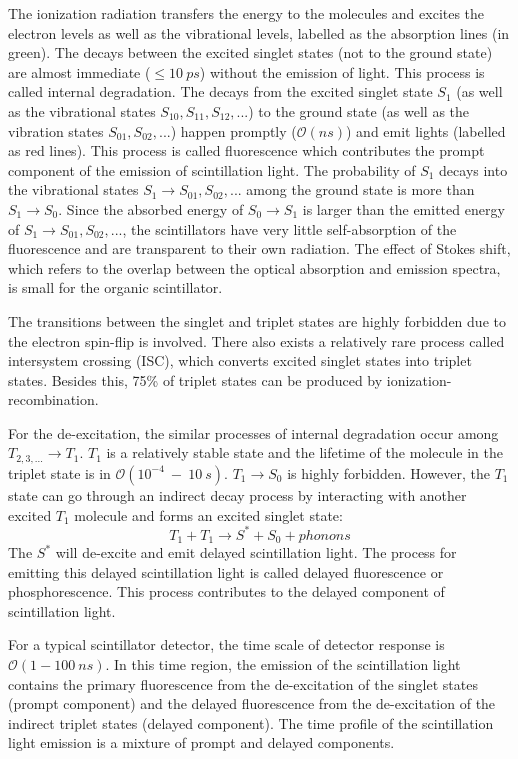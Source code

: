 The ionization radiation transfers the energy to the molecules and excites the electron levels as well as the vibrational levels, labelled as the absorption lines (in green). The decays between the excited singlet states (not to the ground state) are almost immediate ($\leq 10~ps$) without the emission of light. This process is called internal degradation. The decays from the excited singlet state $S_1$ (as well as the vibrational states $S_{10},S_{11},S_{12},...$) to the ground state (as well as the vibration states $S_{01}, S_{02}, ...$) happen promptly ($\mathcal{O}(ns)$) and emit lights (labelled as red lines). This process is called fluorescence which contributes the prompt component of the emission of scintillation light. The probability of $S_1$ decays into the vibrational states $S_1 \to S_{01},S_{02},...$ among the ground state is more than $S_1\to S_0$. Since the absorbed energy of $S_0 \to S_1$ is larger than the emitted energy of $S_1 \to S_{01},S_{02},...$, the scintillators have very little self-absorption of the fluorescence and are transparent to their own radiation. The effect of Stokes shift, which refers to the overlap between the optical absorption and emission spectra, is small for the organic scintillator\cite{leo2012techniques,knoll2010radiation}. 

The transitions between the singlet and triplet states are highly forbidden due to the
electron spin-flip is involved\cite{von2015measurement,sorensen2016temperature}. There also exists a relatively rare process called intersystem crossing (ISC), which converts excited singlet states into triplet states. Besides this, 75\% of triplet states can be produced by ionization-recombination\cite{von2015measurement,dunger2018topological}.

For the de-excitation, the similar processes of internal degradation occur among $T_{2,3, ...} \to T_1$. $T_1$ is a relatively stable state and the lifetime of the molecule in the triplet state is in $\mathcal{O}(10^{-4}~-~10~s)$\cite{mcquarrie1997physical}. $T_1\to S_0$ is highly forbidden. However, the $T_1$ state can go through an indirect decay process by interacting with another excited $T_1$ molecule and forms an excited singlet state:
\[
T_1+T_1\to S^*+S_0+phonons
\]
The $S^*$ will de-excite and emit delayed scintillation light. The process for emitting this delayed scintillation light is called delayed fluorescence or phosphorescence\cite{leo2012techniques}. This process contributes to the delayed component of scintillation light.

For a typical scintillator detector, the time scale of detector response is $\mathcal{O}(1-100~ns)$. In this time region, the emission of the scintillation light contains the primary fluorescence from the de-excitation of the singlet states (prompt component) and the delayed fluorescence from the de-excitation of the indirect triplet states (delayed component)\cite{dunger2018topological}. The time profile of the scintillation light emission is a mixture of prompt and delayed components. 

